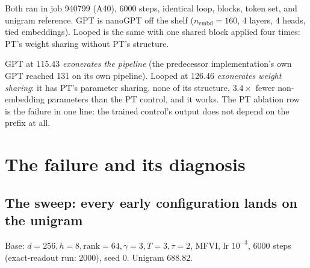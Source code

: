 \documentclass[10pt,a4paper]{article}
\begin{document}
Both ran in job 940799 (A40), 6000 steps, identical loop, blocks, token set, and unigram
reference. GPT is nanoGPT off the shelf ($n_{\mathrm{embd}}{=}160$, 4 layers, 4 heads, tied
embeddings). Looped is the same with one shared block applied four times: PT's weight
sharing without PT's structure.

\begin{table}[h]\centering\small
{}
\end{table}

GPT at 115.43 \emph{exonerates the pipeline} (the predecessor implementation's own GPT
reached 131 on its own pipeline). Looped at 126.46 \emph{exonerates weight sharing}: it has
PT's parameter sharing, none of its structure, $3.4\times$ fewer non-embedding parameters
than the PT control, and it works. The PT ablation row is the failure in one line: the
trained control's output does not depend on the prefix at all.

\section{The failure and its diagnosis}

\subsection{The sweep: every early configuration lands on the unigram}

Base: $d{=}256, h{=}8, \mathrm{rank}{=}64, \gamma{=}3, T{=}3, \tau{=}2$, MFVI, lr $10^{-3}$,
6000 steps (exact-readout run: 2000), seed 0. Unigram 688.82.
\end{document}
